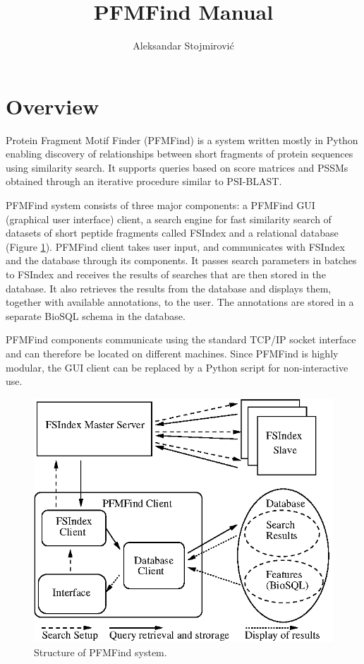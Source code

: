 \documentclass[11pt]{article}
\title{PFMFind Manual}
\author{Aleksandar Stojmirovi\'c}
\begin{document}
\maketitle
\tableofcontents

\newpage

\section{Overview}
Protein Fragment Motif Finder (PFMFind) is a system written mostly in Python enabling discovery of relationships between short fragments of protein sequences using similarity search. It supports queries based on score matrices and PSSMs obtained through an iterative procedure similar to PSI-BLAST.

PFMFind system consists of three major components: a PFMFind GUI (graphical user interface) client, a search engine for fast similarity search of datasets of short peptide fragments called FSIndex and a relational database (Figure \ref{fig:PFMFind_struct}). PFMFind client takes user input, and communicates with FSIndex and the database through its components. It passes search parameters in batches to FSIndex and receives the results of searches that are then stored in the database. It also retrieves the results from the database and displays them, together with available annotations, to the user. The annotations are stored in a separate BioSQL schema in the database.

PFMFind components communicate using the standard TCP/IP socket interface and can therefore be located on different machines. Since PFMFind is highly modular, the GUI client can be replaced by a Python script for non-interactive use.

\begin{figure}[!tpb]
\centerline{\includegraphics{PFMFind_struct.eps}}
\caption{Structure of PFMFind system.}\label{fig:PFMFind_struct}
\end{figure}
\end{document}
